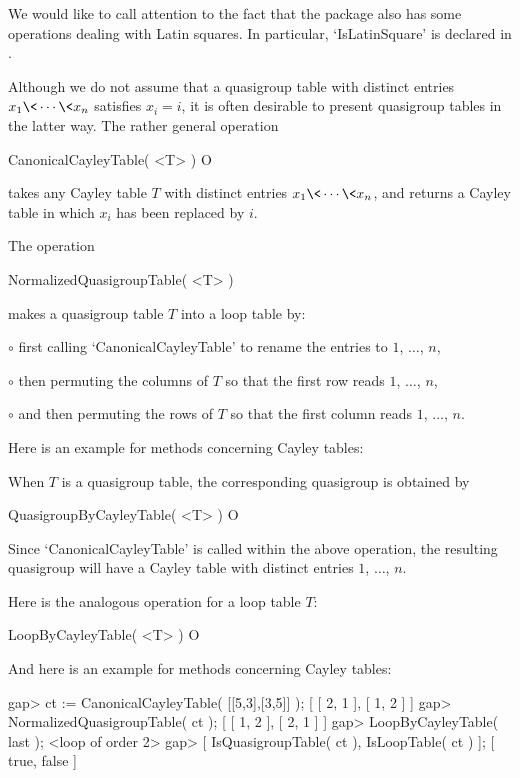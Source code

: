 We would like to call attention to the fact that the package 
also has some operations dealing with Latin squares. In particular,
`IsLatinSquare' is declared in .


Although we do not assume that a quasigroup table with distinct entries
$x_1\<\cdots\<x_n$ satisfies $x_i=i$, it is often desirable to present
quasigroup tables in the latter way. The rather general operation

\>CanonicalCayleyTable( <T> ) O

takes any Cayley table $T$ with distinct entries $x_1\<\cdots\<x_n$, and
returns a Cayley table in which $x_i$ has been replaced by $i$.

The operation

\>NormalizedQuasigroupTable( <T> )

makes a quasigroup table $T$ into a loop table by:
\beginlist%
\item{$\circ$} first calling `CanonicalCayleyTable' to rename the entries to $1$,
    $\dots$, $n$,
\item{$\circ$} then permuting the columns of $T$ so that the first row reads
    $1$, $\dots$, $n$,
\item{$\circ$} and then permuting the rows of $T$ so that the first column
    reads $1$, $\dots$, $n$.
\endlist

Here is an example for methods concerning Cayley tables:


When $T$ is a quasigroup table, the corresponding quasigroup is obtained by

\>QuasigroupByCayleyTable( <T> ) O

Since `CanonicalCayleyTable' is called within the above operation, the
resulting quasigroup will have a Cayley table with distinct entries $1$,
$\dots$, $n$.

Here is the analogous operation for a loop table $T$:

\>LoopByCayleyTable( <T> ) O

And here is an example for methods concerning Cayley tables:

\beginexample
gap> ct := CanonicalCayleyTable( [[5,3],[3,5]] );
[ [ 2, 1 ], [ 1, 2 ] ]
gap> NormalizedQuasigroupTable( ct );
[ [ 1, 2 ], [ 2, 1 ] ]
gap> LoopByCayleyTable( last );
<loop of order 2>
gap> [ IsQuasigroupTable( ct ), IsLoopTable( ct ) ];
[ true, false ]
\endexample


